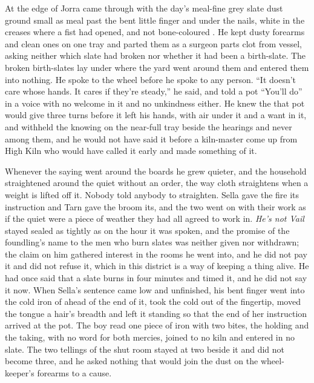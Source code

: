 At the edge of  Jorra came through with the day's meal-fine grey slate dust ground small as meal past the bent little finger and under the nails, white in the creases where a fist had opened, and not bone-coloured . He kept dusty forearms and clean ones on one tray and parted them as a surgeon parts clot from vessel, asking neither which slate had broken nor whether it had been a birth-slate. The broken birth-slates lay under  where the yard went around them and entered them into nothing. He spoke to the wheel before he spoke to any person. “It doesn't care whose hands. It cares if they're steady,” he said, and told a pot “You'll do” in a voice with no welcome in it and no unkindness either. He knew the  that pot would give three turns before it left his hands, with air under it and a want in it, and withheld the knowing on the near-full tray beside the hearings and never among them, and he would not have said it before a kiln-master come up from High Kiln who would have called it early and made something of it.

Whenever the saying went around the boards he grew quieter, and the household straightened around the quiet without an order, the way cloth straightens when a weight is lifted off it. Nobody told anybody to straighten. Sella gave the fire its instruction and Tarn gave the broom its, and the two went on with their work as if the quiet were a piece of weather they had all agreed to work in. \emph{He's not Vail} stayed sealed as tightly as on the hour it was spoken, and the promise of the foundling's name to the men who burn slates was neither given nor withdrawn; the claim on him gathered interest in the rooms he went into, and he did not pay it and did not refuse it, which in this district is a way of keeping a thing alive. He had once said that a slate burns in four minutes and timed it, and he did not say it now. When Sella's sentence came low and unfinished, his bent finger went into the cold iron of  ahead of the end of it, took the cold out of the fingertip, moved the tongue a hair's breadth and left it standing so that the end of her instruction arrived at the pot. The boy read one piece of iron with two bites, the holding and the taking, with no  word for both mercies, joined to no kiln and entered in no slate. The two tellings of the shut room stayed at two beside it and did not become three, and he asked nothing that would join the dust on the wheel-keeper's forearms to a cause.

